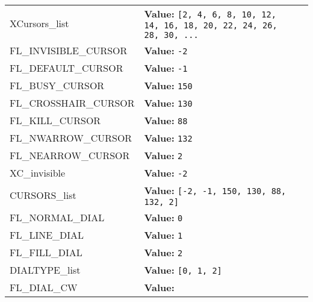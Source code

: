 \begin{longtable}{|p{\varnamewidth}|p{\vardescrwidth}|l}
\raggedright X\-C\-u\-r\-s\-o\-r\-s\-\_\-l\-i\-s\-t\- & \raggedright \textbf{Value:} 
{\tt \texttt{[}2\texttt{, }4\texttt{, }6\texttt{, }8\texttt{, }10\texttt{, }12\texttt{, }14\texttt{, }16\texttt{, }18\texttt{, }20\texttt{, }22\texttt{, }24\texttt{, }26\texttt{, }28\texttt{, }30\texttt{, }\texttt{...}}&\\
\cline{1-2}
\raggedright F\-L\-\_\-I\-N\-V\-I\-S\-I\-B\-L\-E\-\_\-C\-U\-R\-S\-O\-R\- & \raggedright \textbf{Value:} 
{\tt -2}&\\
\cline{1-2}
\raggedright F\-L\-\_\-D\-E\-F\-A\-U\-L\-T\-\_\-C\-U\-R\-S\-O\-R\- & \raggedright \textbf{Value:} 
{\tt -1}&\\
\cline{1-2}
\raggedright F\-L\-\_\-B\-U\-S\-Y\-\_\-C\-U\-R\-S\-O\-R\- & \raggedright \textbf{Value:} 
{\tt 150}&\\
\cline{1-2}
\raggedright F\-L\-\_\-C\-R\-O\-S\-S\-H\-A\-I\-R\-\_\-C\-U\-R\-S\-O\-R\- & \raggedright \textbf{Value:} 
{\tt 130}&\\
\cline{1-2}
\raggedright F\-L\-\_\-K\-I\-L\-L\-\_\-C\-U\-R\-S\-O\-R\- & \raggedright \textbf{Value:} 
{\tt 88}&\\
\cline{1-2}
\raggedright F\-L\-\_\-N\-W\-A\-R\-R\-O\-W\-\_\-C\-U\-R\-S\-O\-R\- & \raggedright \textbf{Value:} 
{\tt 132}&\\
\cline{1-2}
\raggedright F\-L\-\_\-N\-E\-A\-R\-R\-O\-W\-\_\-C\-U\-R\-S\-O\-R\- & \raggedright \textbf{Value:} 
{\tt 2}&\\
\cline{1-2}
\raggedright X\-C\-\_\-i\-n\-v\-i\-s\-i\-b\-l\-e\- & \raggedright \textbf{Value:} 
{\tt -2}&\\
\cline{1-2}
\raggedright C\-U\-R\-S\-O\-R\-S\-\_\-l\-i\-s\-t\- & \raggedright \textbf{Value:} 
{\tt \texttt{[}-2\texttt{, }-1\texttt{, }150\texttt{, }130\texttt{, }88\texttt{, }132\texttt{, }2\texttt{]}}&\\
\cline{1-2}
\raggedright F\-L\-\_\-N\-O\-R\-M\-A\-L\-\_\-D\-I\-A\-L\- & \raggedright \textbf{Value:} 
{\tt 0}&\\
\cline{1-2}
\raggedright F\-L\-\_\-L\-I\-N\-E\-\_\-D\-I\-A\-L\- & \raggedright \textbf{Value:} 
{\tt 1}&\\
\cline{1-2}
\raggedright F\-L\-\_\-F\-I\-L\-L\-\_\-D\-I\-A\-L\- & \raggedright \textbf{Value:} 
{\tt 2}&\\
\cline{1-2}
\raggedright D\-I\-A\-L\-T\-Y\-P\-E\-\_\-l\-i\-s\-t\- & \raggedright \textbf{Value:} 
{\tt \texttt{[}0\texttt{, }1\texttt{, }2\texttt{]}}&\\
\cline{1-2}
\raggedright F\-L\-\_\-D\-I\-A\-L\-\_\-C\-W\- & \raggedright \textbf{Value:} 

\end{longtable}
